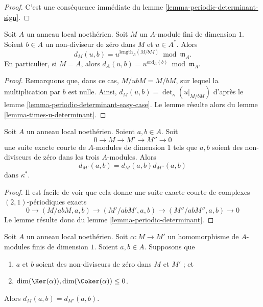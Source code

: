 \begin{proof}
C'est une conséquence immédiate du lemme \ref{lemma-periodic-determinant-sign}.
\end{proof}

\begin{lemma}
\label{lemma-symbol-when-one-is-a-unit}
Soit $A$ un anneau local noethérien.
Soit $M$ un $A$-module fini de dimension $1$.
Soient $b \in A$ un non-diviseur de zéro dans $M$ et $u \in A^*$.
Alors
$$
d_M(u, b) = u^{\text{length}_A(M/bM)} \bmod \mathfrak m_A.
$$
En particulier, si $M = A$, alors
$d_A(u, b) = u^{\text{ord}_A(b)} \bmod \mathfrak m_A$.
\end{lemma}

\begin{proof}
Remarquons que, dans ce cas, $M/ubM = M/bM$, sur lequel la multiplication
par $b$ est nulle. Ainsi, $d_M(u, b) = \det_\kappa(u|_{M/bM})$
d'après le lemme \ref{lemma-periodic-determinant-easy-case}. Le lemme
résulte alors du lemme \ref{lemma-times-u-determinant}.
\end{proof}

\begin{lemma}
\label{lemma-symbol-short-exact-sequence}
Soit $A$ un anneau local noethérien.
Soient $a, b \in A$.
Soit
$$
0 \to M \to M' \to M'' \to 0
$$
une suite exacte courte de $A$-modules de dimension $1$
tels que $a, b$ soient des non-diviseurs de zéro dans
les trois $A$-modules.
Alors
$$
d_{M'}(a, b) = d_M(a, b) d_{M''}(a, b)
$$
dans $\kappa^*$.
\end{lemma}

\begin{proof}
Il est facile de voir que cela donne une suite exacte courte
de complexes $(2, 1)$-périodiques exacts
$$
0 \to
(M/abM, a, b) \to
(M'/abM', a, b) \to
(M''/abM'', a, b) \to 0
$$
Le lemme résulte donc du lemme \ref{lemma-periodic-determinant}.
\end{proof}

\begin{lemma}
\label{lemma-symbol-compare-modules}
Soit $A$ un anneau local noethérien.
Soit $\alpha : M \to M'$ un homomorphisme de
$A$-modules finis de dimension $1$.
Soient $a, b \in A$. Supposons que
\begin{enumerate}
\item $a$ et $b$ soient des non-diviseurs de zéro dans $M$ et $M'$ ; et
\item $\dim(\Ker(\alpha)), \dim(\Coker(\alpha)) \leq 0$.
\end{enumerate}
Alors $d_M(a, b) = d_{M'}(a, b)$.
\end{lemma}

